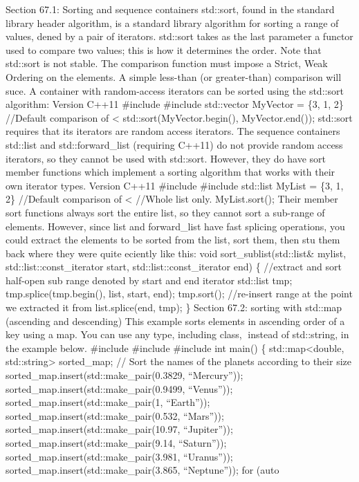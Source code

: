 Section 67.1: Sorting and sequence containers std::sort, found in the
standard library header algorithm, is a standard library algorithm for
sorting a range of values, dened by a pair of iterators. std::sort takes
as the last parameter a functor used to compare two values; this is how
it determines the order. Note that std::sort is not stable. The
comparison function must impose a Strict, Weak Ordering on the elements.
A simple less-than (or greater-than) comparison will suce. A container
with random-access iterators can be sorted using the std::sort
algorithm: Version C++11 \#include \#include std::vector MyVector = \{3,
1, 2\} //Default comparison of \textless{} std::sort(MyVector.begin(),
MyVector.end()); std::sort requires that its iterators are random access
iterators. The sequence containers std::list and std::forward\_list
(requiring C++11) do not provide random access iterators, so they cannot
be used with std::sort. However, they do have sort member functions
which implement a sorting algorithm that works with their own iterator
types. Version C++11 \#include \#include std::list MyList = \{3, 1, 2\}
//Default comparison of \textless{} //Whole list only. MyList.sort();
Their member sort functions always sort the entire list, so they cannot
sort a sub-range of elements. However, since list and forward\_list have
fast splicing operations, you could extract the elements to be sorted
from the list, sort them, then stu them back where they were quite
eciently like this: void sort\_sublist(std::list\& mylist,
std::list::const\_iterator start, std::list::const\_iterator end) \{
//extract and sort half-open sub range denoted by start and end iterator
std::list tmp; tmp.splice(tmp.begin(), list, start, end); tmp.sort();
//re-insert range at the point we extracted it from list.splice(end,
tmp); \} Section 67.2: sorting with std::map (ascending and descending)
This example sorts elements in ascending order of a key using a map. You
can use any type, including class, instead of std::string, in the
example below. \#include \#include \#include int main() \{
std::map\textless double, std::string\textgreater{} sorted\_map; // Sort
the names of the planets according to their size
sorted\_map.insert(std::make\_pair(0.3829, ``Mercury''));
sorted\_map.insert(std::make\_pair(0.9499, ``Venus''));
sorted\_map.insert(std::make\_pair(1, ``Earth''));
sorted\_map.insert(std::make\_pair(0.532, ``Mars''));
sorted\_map.insert(std::make\_pair(10.97, ``Jupiter''));
sorted\_map.insert(std::make\_pair(9.14, ``Saturn''));
sorted\_map.insert(std::make\_pair(3.981, ``Uranus''));
sorted\_map.insert(std::make\_pair(3.865, ``Neptune'')); for (auto
